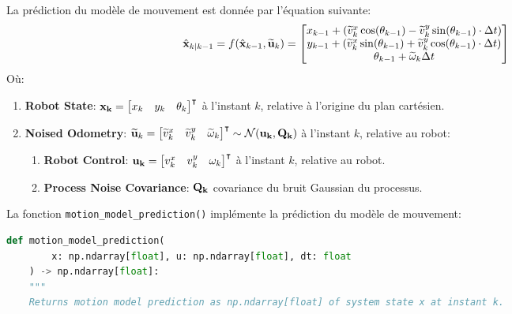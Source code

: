 \documentclass[../CSC_5RO12_TA_TP2.tex]{subfiles}
\begin{document}
\begin{definition}
    La prédiction du modèle de mouvement est donnée par l'équation suivante:
    \begin{equation}
        \hat{\bf{x}}_{k|k-1} = f(\hat{\bf{x}}_{k-1}, \widetilde{\bf{u}}_{k}) = \begin{bmatrix}
            x_{k-1} + (\widetilde{v}^{x}_{k} \cos(\theta_{k-1}) - \widetilde{v}^{y}_{k} \sin(\theta_{k-1}) \cdot \Delta t )\\
            y_{k-1} + (\widetilde{v}^{x}_{k} \sin(\theta_{k-1}) + \widetilde{v}^{y}_{k} \cos(\theta_{k-1}) \cdot \Delta t )\\
            \theta_{k-1} + \widetilde{\omega}_{k} \Delta t\\
        \end{bmatrix}
    \end{equation}
    Où:
    \begin{enumerate}[noitemsep]
        \item \textbf{Robot State}: $\bf{x}_{k} = \begin{bmatrix} x_{k} & y_{k} & \theta_{k} \end{bmatrix}^{\intercal}$ à l'instant $k$, relative à l'origine du plan cartésien.
        \item \textbf{Noised Odometry}: $\widetilde{\bf{u}}_{k} = \begin{bmatrix} \widetilde{v}^{x}_{k} & \widetilde{v}^{y}_{k} & \widetilde{\omega}_{k} \end{bmatrix}^{\intercal} \sim \mathcal{N}(\bf{u}_{k}, \bf{Q}_{k})$ à l'instant $k$, relative au robot:
        \begin{enumerate}[noitemsep]
            \item \textbf{Robot Control}: $\bf{u}_{k} = \begin{bmatrix} v^{x}_{k} & v^{y}_{k} & \omega_{k} \end{bmatrix}^{\intercal}$ à l'instant $k$, relative au robot.
            \item \textbf{Process Noise Covariance}: $\bf{Q}_{k}$ covariance du bruit Gaussian du processus.
        \end{enumerate}
    \end{enumerate}
    La fonction \texttt{motion\_model\_prediction()} implémente la prédiction du modèle de mouvement:
    \begin{scriptsize}\mycode
        \begin{lstlisting}[language=Python, caption=\texttt{motion\_model\_prediction()}]
def motion_model_prediction(
        x: np.ndarray[float], u: np.ndarray[float], dt: float
    ) -> np.ndarray[float]:
    """
    Returns motion model prediction as np.ndarray[float] of system state x at instant k.


\end{lstlisting}
\end{scriptsize}
\end{definition}
\end{document}
